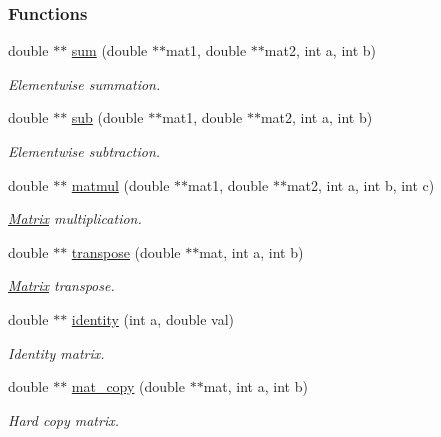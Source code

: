 \subsubsection*{Functions}
\begin{DoxyCompactItemize}
\item 
double $\ast$$\ast$ \hyperlink{Matrix_8C_a66ed07559a4d20174040e69f551a5431}{sum} (double $\ast$$\ast$mat1, double $\ast$$\ast$mat2, int a, int b)
\begin{DoxyCompactList}\small\item\em Elementwise summation. \end{DoxyCompactList}\item 
double $\ast$$\ast$ \hyperlink{Matrix_8C_a238af1517ec23a6f0279ec5ee6364d6a}{sub} (double $\ast$$\ast$mat1, double $\ast$$\ast$mat2, int a, int b)
\begin{DoxyCompactList}\small\item\em Elementwise subtraction. \end{DoxyCompactList}\item 
double $\ast$$\ast$ \hyperlink{Matrix_8C_a74a9fe9c1d326c41a69926c97720f4d2}{matmul} (double $\ast$$\ast$mat1, double $\ast$$\ast$mat2, int a, int b, int c)
\begin{DoxyCompactList}\small\item\em \hyperlink{classMatrix}{Matrix} multiplication. \end{DoxyCompactList}\item 
double $\ast$$\ast$ \hyperlink{Matrix_8C_ab64223fbcc37cc3af54071e71067d05a}{transpose} (double $\ast$$\ast$mat, int a, int b)
\begin{DoxyCompactList}\small\item\em \hyperlink{classMatrix}{Matrix} transpose. \end{DoxyCompactList}\item 
double $\ast$$\ast$ \hyperlink{Matrix_8C_affa4629470e427c236e2a7ac925e4e73}{identity} (int a, double val)
\begin{DoxyCompactList}\small\item\em Identity matrix. \end{DoxyCompactList}\item 
double $\ast$$\ast$ \hyperlink{Matrix_8C_a8f5f4f6401312604aebc715cca176985}{mat\+\_\+copy} (double $\ast$$\ast$mat, int a, int b)
\begin{DoxyCompactList}\small\item\em Hard copy matrix. \end{DoxyCompactList}\item 

\end{DoxyCompactItemize}
